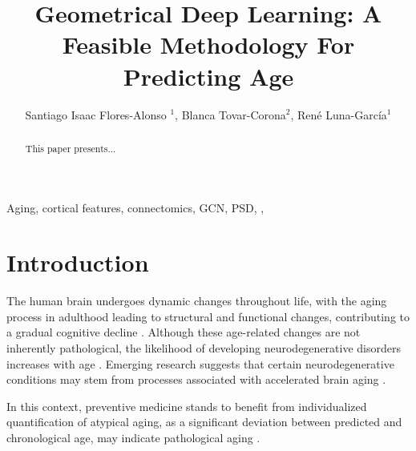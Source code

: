 \documentclass{cys}
\title{Geometrical Deep Learning: A Feasible Methodology For Predicting Age}
\author{Santiago Isaac Flores-Alonso $^1$, Blanca Tovar-Corona$^2$, René Luna-García$^1$}
\affil{ 
$^1$ IPN,CIC, Ciudad de México 07738,   \authorcr   %
México            
\authorcr \authorcr
$^2$ IPN,UPIITA, Ciudad de México 07340, \authorcr
México             
\authorcr  \authorcr
                  
\authorcr  \authorcr
sfloresa2010@alumno.ipn.mx, bltovar@ipn.mx, rlunag@ipn.mx
\authorcr  \authorcr
}
\begin{document}
\maketitle

\renewcommand{\tablename}{Table}

\begin{abstract}
This paper presents...
\end{abstract}

\begin{keywords} 
Aging, cortical features, connectomics, GCN, PSD, , 
\end{keywords} 



\section{Introduction}
\label{sec:introduction}



The human brain undergoes dynamic changes throughout life, with the aging process in adulthood leading to structural and functional changes, contributing to a gradual cognitive decline \cite{yankner2008aging}. Although these age-related changes are not inherently pathological, the likelihood of developing neurodegenerative disorders increases with age \cite{baecker2021machine, nguyen2024brain}. Emerging research suggests that certain neurodegenerative conditions may stem from processes associated with accelerated brain aging \cite{isaev2018accelerated}.

\bigskip In this context, preventive medicine stands to benefit from individualized quantification of atypical aging, as a significant deviation between predicted and chronological age, may indicate pathological aging \cite{lee2023choice}. %
\end{document}
